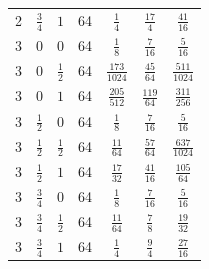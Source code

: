 {\begin{longtable}{lrrrccc}
2 & $\frac{3}{4}$ & $1$ & 64 & $\frac{1}{4}$ & $\frac{17}{4}$ & $\frac{41}{16}$ \\[2pt]
3 & $0$ & $0$ & 64 & $\frac{1}{8}$ & $\frac{7}{16}$ & $\frac{5}{16}$ \\[2pt]
3 & $0$ & $\frac{1}{2}$ & 64 & $\frac{173}{1024}$ & $\frac{45}{64}$ & $\frac{511}{1024}$ \\[2pt]
3 & $0$ & $1$ & 64 & $\frac{205}{512}$ & $\frac{119}{64}$ & $\frac{311}{256}$ \\[2pt]
3 & $\frac{1}{2}$ & $0$ & 64 & $\frac{1}{8}$ & $\frac{7}{16}$ & $\frac{5}{16}$ \\[2pt]
3 & $\frac{1}{2}$ & $\frac{1}{2}$ & 64 & $\frac{11}{64}$ & $\frac{57}{64}$ & $\frac{637}{1024}$ \\[2pt]
3 & $\frac{1}{2}$ & $1$ & 64 & $\frac{17}{32}$ & $\frac{41}{16}$ & $\frac{105}{64}$ \\[2pt]
3 & $\frac{3}{4}$ & $0$ & 64 & $\frac{1}{8}$ & $\frac{7}{16}$ & $\frac{5}{16}$ \\[2pt]
3 & $\frac{3}{4}$ & $\frac{1}{2}$ & 64 & $\frac{11}{64}$ & $\frac{7}{8}$ & $\frac{19}{32}$ \\[2pt]
3 & $\frac{3}{4}$ & $1$ & 64 & $\frac{1}{4}$ & $\frac{9}{4}$ & $\frac{27}{16}$ \\[2pt]
\hline\end{longtable}}
